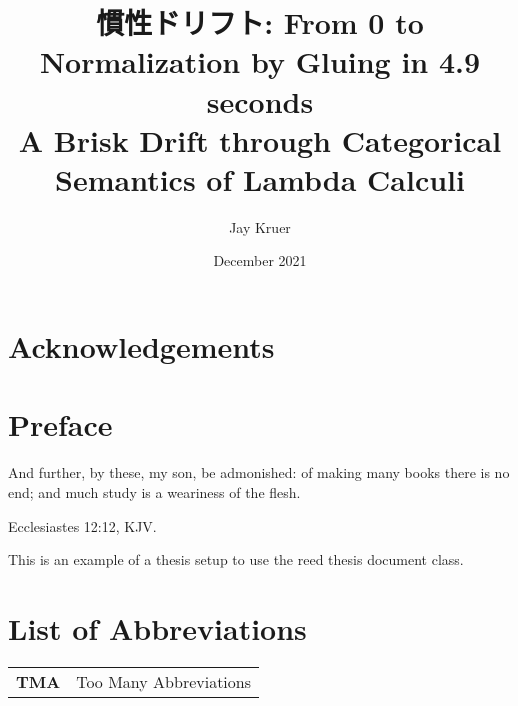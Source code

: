 \documentclass[12pt,twoside]{reedthesis}
\title{慣性ドリフト: From 0 to Normalization by Gluing in 4.9 seconds\\ A Brisk Drift through Categorical Semantics of Lambda Calculi}
\author{Jay Kruer}
\date{December 2021}
\theoremstyle{definition}
\theoremstyle{remark}
\theoremstyle{plain}
\begin{document}
\maketitle
\frontmatter %
\pagestyle{empty} %

\chapter*{Acknowledgements}

%


\chapter*{Preface}
\epigraph{And further, by these, my son, be admonished: of making many books
  there is no end; and much study is a weariness of the flesh.}{Ecclesiastes
  12:12, KJV.}

This is an example of a thesis setup to use the reed thesis
document class.

\chapter*{List of Abbreviations}
\begin{table}[h]
  \centering %
  \begin{tabular}{ll}
    \textbf{TMA}  	&  Too Many Abbreviations
  \end{tabular}
\end{table}


\tableofcontents
\listoftables
\listoffigures
\end{document}
